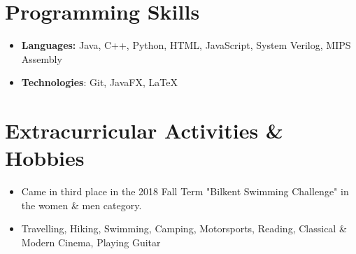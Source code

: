 \documentclass[letterpaper,11pt]{article}
\newcommand{\resumeSubHeadingListStart}{\begin{itemize}[leftmargin=*]}
\newcommand{\resumeSubHeadingListEnd}{\end{itemize}}
\begin{document}
\section{Programming Skills}
  \resumeSubHeadingListStart
    \item{
      \textbf{Languages:}{ Java, C++, Python, HTML, JavaScript, System Verilog, MIPS Assembly}
    }
    \item{
      \textbf{Technologies}{: Git, JavaFX, LaTeX}
    }
  \resumeSubHeadingListEnd



\section{Extracurricular Activities \& Hobbies}
  \resumeSubHeadingListStart
    \item{
      \textbf{}{ Came in third place in the 2018 Fall Term "Bilkent Swimming Challenge" in the women \& men category.}
    }
    \item{
      \textbf{}{ Travelling, Hiking, Swimming, Camping, Motorsports, Reading, Classical \& Modern Cinema, Playing Guitar  }
    }
  \resumeSubHeadingListEnd


\end{document}
